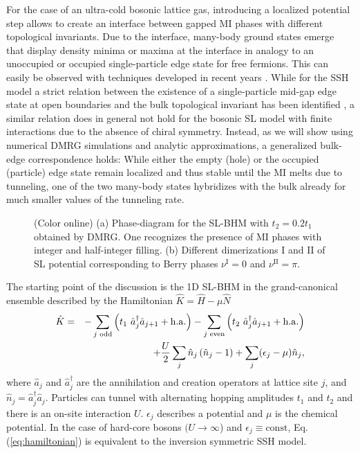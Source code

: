 \documentclass[pra,aps,twocolumn,showpacs]{revtex4}
\newcommand{\ad}{\hat{a}^\dagger}
\renewcommand{\a}{\hat{a}}
\newcommand{\nb}{\hat{n}}
\begin{document}
For the case of an ultra-cold bosonic lattice gas, introducing a
localized potential step allows to create an interface between gapped
MI phases with different topological invariants.
Due to the interface, many-body ground states emerge that display density minima or maxima
at the interface in analogy to an unoccupied or occupied single-particle edge state for free fermions. This 
can easily be observed with techniques developed in recent years \cite{Gericke-NatPhys-2008,Bakr-Nature-2009,Sherson-Nature-2010}. 
While for the SSH model a strict relation between the existence of a single-particle mid-gap edge state
at open boundaries and the bulk topological invariant has been identified \cite{Ryu2002,Delplace2011}, a
similar relation does in general not hold for the bosonic SL model with finite interactions
due to the absence of chiral symmetry. Instead, as 
we will show using numerical DMRG simulations \cite{White1992,Verstraete2006,Schollwock2011} and analytic 
approximations, a generalized bulk-edge correspondence 
holds: While either the empty (hole) or the occupied (particle) edge state remain localized and thus stable until the MI melts due to tunneling, one of the two many-body states hybridizes with the bulk already for much smaller
values of the tunneling rate.



\begin{figure}[hbt]
 \centering
 \caption{(Color online) (a) Phase-diagram for the SL-BHM with 
$t_2 = 0.2 t_1$ obtained by DMRG. One recognizes the presence of MI phases with
integer and half-integer filling.
(b) Different dimerizations I and II of SL potential corresponding to
Berry phases $\nu^\text{I}=0$ and $\nu^{\text{II}}=\pi$.} 
 \label{fig:phase_diagram_hopping}
\end{figure}

The starting point of the discussion is the 1D SL-BHM
in the grand-canonical ensemble described by the 
Hamiltonian $\hat K=\hat H-\mu \hat N$
%
%
\begin{eqnarray}
\hat{K}&=&-\sum_{j \text{ odd}} \left(t_1\ \ad_{j}\a_{j+1}+\rm{h.a.}\right)-\sum_{j \text{ even}} \left(t_2\ \ad_{j}\a_{j+1}+\rm{h.a.}\right)\nonumber\\
&& +\frac{U}{2}\sum_j\nb_j\left(\nb_j-1\right) +\sum_j (\epsilon_j-\mu) \nb_j,\label{eq:hamiltonian}
\end{eqnarray}
%
%
where $\a_j$ and $\ad_j$ are the annihilation and creation operators at lattice site
$j$, and $\nb_j=\ad_j\a_j$. Particles can tunnel with alternating hopping amplitudes $t_1$ and $t_2$ and 
there is an on-site interaction  $U$. $\epsilon_j$ describes a potential and $\mu$ is the chemical potential. 
In the case of hard-core bosons $(U\to \infty$) and $\epsilon_j\equiv \text{const}$, Eq. (\ref{eq:hamiltonian}) 
is equivalent to the inversion symmetric SSH model.
\end{document}
